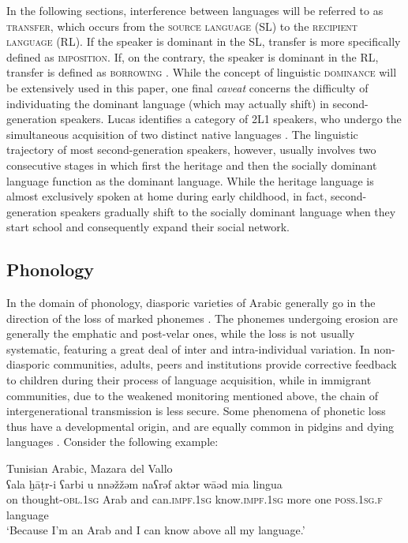 \documentclass[output=paper]{langsci/langscibook}
\begin{document}
In the following sections, interference between languages will be referred to as \textsc{transfer}, which occurs from the \textsc{source} \textsc{language} (SL) to the \textsc{recipient} \textsc{language} (RL). If the speaker is dominant in the SL, transfer is more specifically defined as \textsc{imposition}. If, on the contrary, the speaker is dominant in the RL, transfer is defined as \textsc{borrowing} \citep{VanCoetsem1988, VanCoetsem2000,Lucas2015}. While the concept of linguistic \textsc{dominance} will be extensively used in this paper, one final \textit{caveat} concerns the difficulty of individuating the dominant language (which may actually shift) in second-generation speakers. Lucas identifies a category of 2L1 speakers, who undergo the simultaneous acquisition of two distinct native languages \citep[525]{Lucas2015}. The linguistic trajectory of most second-generation speakers, however, usually involves two consecutive stages in which first the heritage and then the socially dominant language function as the dominant language. While the heritage language is almost exclusively spoken at home during early childhood, in fact, second-generation speakers gradually shift to the socially dominant language when they start school and consequently expand their social network.


 
 \subsection{Phonology}


In the domain of phonology, diasporic varieties of Arabic generally go in the direction of the loss of marked phonemes \citep[293]{Versteegh2014book}. The phonemes undergoing erosion are generally the emphatic and post-velar ones, while the loss is not usually systematic, featuring a great deal of inter and intra-individual variation. In non-diasporic communities, adults, peers and institutions provide corrective feedback to children during their process of language acquisition, while in immigrant communities, due to the weakened monitoring mentioned above, the chain of intergenerational transmission is less secure. Some phenomena of phonetic loss thus have a developmental origin, and are equally common in pidgins and dying languages \citep[372–373]{Romaine1989}. Consider the following example:

\ea\label{ex:key:maz}
{Tunisian Arabic, Mazara del Vallo \citep[85]{Danna2017book}}\\
\gll ʕala ḫāṭr-i ʕarbi u nnəžžəm naʕrəf aktər wāəd mia lingua\\
     on thought-\textsc{obl.1sg} Arab and can.\textsc{impf.1sg} know.\textsc{impf.1sg} more one \textsc{poss.1sg.f} language\\
\glt `Because I’m an Arab and I can know above all my language.'
\z
\end{document}
